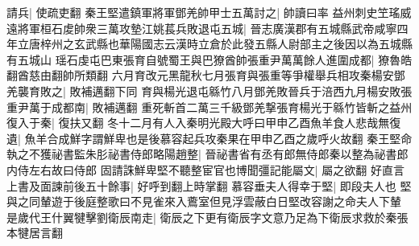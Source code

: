 請兵|{
	使疏吏翻}
秦王堅遣鎮軍將軍鄧羌帥甲士五萬討之|{
	帥讀曰率}
益州刺史笁瑤威遠將軍桓石䖍帥衆三萬攻墊江姚萇兵敗退屯五城|{
	晉志廣漢郡有五城縣武帝咸寧四年立唐梓州之玄武縣也華陽國志云漢時立倉於此發五縣人尉部主之後因以為五城縣有五城山}
瑶石虔屯巴東張育自號蜀王與巴獠酋帥張重尹萬萬餘人進圍成都|{
	獠魯皓翻酋慈由翻帥所類翻}
六月育改元黑龍秋七月張育與張重等爭權舉兵相攻秦楊安鄧羌襲育敗之|{
	敗補邁翻下同}
育與楊光退屯緜竹八月鄧羌敗晉兵于涪西九月楊安敗張重尹萬于成都南|{
	敗補邁翻}
重死斬首二萬三千級鄧羌撃張育楊光于緜竹皆斬之益州復入于秦|{
	復扶又翻}
冬十二月有人入秦明光殿大呼曰甲申乙酉魚羊食人悲哉無復遺|{
	魚羊合成鮮字謂鮮卑也是後慕容起兵攻秦果在甲申乙酉之歲呼火故翻}
秦王堅命執之不獲祕書監朱肜祕書侍郎略陽趙整|{
	晉祕書省有丞有郎無侍郎秦以整為祕書郎内侍左右故曰侍郎}
固請誅鮮卑堅不聽整宦官也博聞彊記能屬文|{
	屬之欲翻}
好直言上書及面諫前後五十餘事|{
	好呼到翻上時掌翻}
慕容垂夫人得幸于堅|{
	即段夫人也}
堅與之同輦遊于後庭整歌曰不見雀來入鷰室但見浮雲蔽白日堅改容謝之命夫人下輦　是歲代王什翼犍擊劉衛辰南走|{
	衛辰之下更有衛辰字文意乃足為下衛辰求救於秦張本犍居言翻}


